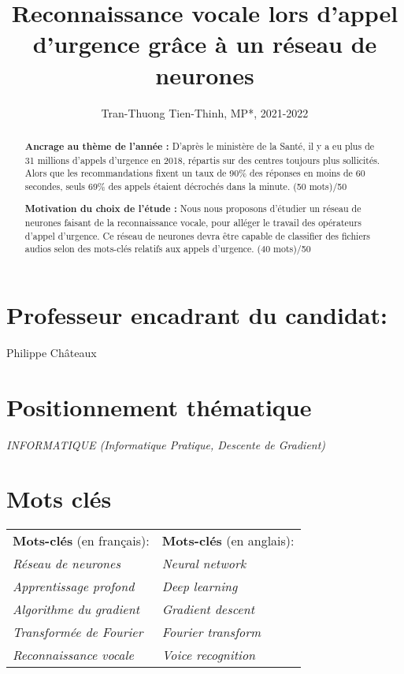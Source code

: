 \documentclass[12pt,a4paper, french]{article}
\title{Reconnaissance vocale lors d'appel d'urgence grâce à un réseau de neurones}
\author{Tran-Thuong Tien-Thinh, MP*, 2021-2022}
\date{}
\begin{document}
\maketitle

\begin{abstract}
\textbf{Ancrage au thème de l'année :}
D'après le ministère de la Santé, il y a eu plus de 31 millions d'appels d'urgence en 2018, répartis sur des centres toujours plus sollicités. Alors que les recommandations fixent un taux de 90\% des réponses en moins de 60 secondes, seuls 69\% des appels étaient décrochés dans la minute.  (50 mots)/50

\textbf{Motivation du choix de l’étude :} Nous nous proposons d'étudier un réseau de neurones faisant de la reconnaissance vocale, pour alléger le travail des opérateurs d'appel d'urgence. Ce réseau de neurones devra être capable de classifier des fichiers audios selon des mots-clés relatifs aux appels d’urgence. (40 mots)/50
\end{abstract}

\section*{Professeur encadrant du candidat:}
Philippe Châteaux

\section*{Positionnement thématique}
\noindent\textit{INFORMATIQUE (Informatique Pratique, Descente de Gradient)}

\section*{Mots clés}
\begin{tabular}{l l}
    \textbf{Mots-clés} (en français): & \textbf{Mots-clés} (en anglais): \\
    \textit{Réseau de neurones} & \textit{Neural network} \\
    \textit{Apprentissage profond} & \textit{Deep learning} \\
    \textit{Algorithme du gradient} & \textit{Gradient descent} \\
    \textit{Transformée de Fourier} & \textit{Fourier transform} \\
    \textit{Reconnaissance vocale} & \textit{Voice recognition} \\
\end{tabular}
\end{document}
